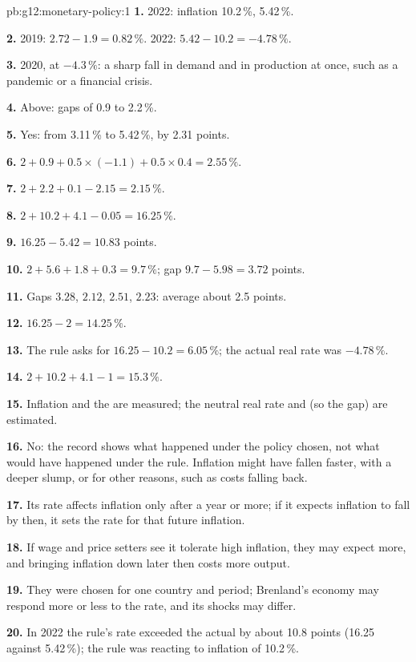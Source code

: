 \begin{solution}{pb:g12:monetary-policy:1}
\textbf{1.} 2022: inflation 10.2\,\%,  5.42\,\%.

\textbf{2.} 2019: $2.72 - 1.9 = 0.82\,\%$. 2022: $5.42 - 10.2 = -4.78\,\%$.

\textbf{3.} 2020, at $-4.3\,\%$: a sharp fall in demand and in production at once, such as a pandemic or a financial crisis.

\textbf{4.} Above: gaps of 0.9 to 2.2\,\%.

\textbf{5.} Yes: from 3.11\,\% to 5.42\,\%, by 2.31 points.

\textbf{6.} $2 + 0.9 + 0.5 \times (-1.1) + 0.5 \times 0.4 = 2.55\,\%$.

\textbf{7.} $2 + 2.2 + 0.1 - 2.15 = 2.15\,\%$.

\textbf{8.} $2 + 10.2 + 4.1 - 0.05 = 16.25\,\%$.

\textbf{9.} $16.25 - 5.42 = 10.83$ points.

\textbf{10.} $2 + 5.6 + 1.8 + 0.3 = 9.7\,\%$; gap $9.7 - 5.98 = 3.72$ points.

\textbf{11.} Gaps $3.28$, $2.12$, $2.51$, $2.23$: average about 2.5 points.

\textbf{12.} $16.25 - 2 = 14.25\,\%$.

\textbf{13.} The rule asks for $16.25 - 10.2 = 6.05\,\%$; the actual real rate was $-4.78\,\%$.

\textbf{14.} $2 + 10.2 + 4.1 - 1 = 15.3\,\%$.

\textbf{15.} Inflation and the  are measured; the neutral real rate and  (so the gap) are estimated.

\textbf{16.} No: the record shows what happened under the policy chosen, not what would have happened under the rule. Inflation might have fallen faster, with a deeper
slump, or for other reasons, such as costs falling back.

\textbf{17.} Its rate affects inflation only after a year or more; if it expects inflation to fall by then, it sets the rate for that future inflation.

\textbf{18.} If wage and price setters see it tolerate high inflation, they may expect more, and bringing inflation down later then costs more output.

\textbf{19.} They were chosen for one country and period; Brenland's economy may respond more or less to the rate, and its shocks may differ.

\textbf{20.} In 2022 the rule's rate exceeded the actual  by about 10.8 points (16.25 against 5.42\,\%); the rule was reacting to inflation of 10.2\,\%.
\end{solution}
